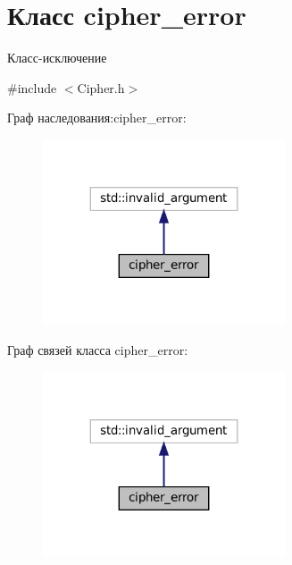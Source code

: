 \hypertarget{classcipher__error}{}\section{Класс cipher\+\_\+error}
\label{classcipher__error}


Класс-\/исключение  




{\ttfamily \#include $<$Cipher.\+h$>$}



Граф наследования\+:cipher\+\_\+error\+:
\nopagebreak
\begin{figure}[H]
\begin{center}
\leavevmode
\includegraphics[width=203pt]{classcipher__error__inherit__graph}
\end{center}
\end{figure}


Граф связей класса cipher\+\_\+error\+:
\nopagebreak
\begin{figure}[H]
\begin{center}
\leavevmode
\includegraphics[width=203pt]{classcipher__error__coll__graph}
\end{center}
\end{figure}
